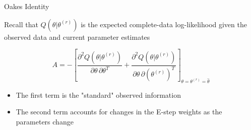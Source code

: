 \documentclass{beamer}
\begin{document}
\begin{frame}{Oakes Identity}

    Recall that $Q(\theta|\theta^{(r)})$ is the expected complete-data log-likelihood given the observed data and current parameter estimates

\[
A=
-\left[
\frac{\partial^2 Q(\theta|\theta^{(r)})}{\partial\theta\,\partial\theta^{T}}
+
\frac{\partial^2 Q(\theta|\theta^{(r)})}{\partial\theta\,\partial(\theta^{(r)})^{T}}
\right]_{\theta=\theta^{(r)}=\widehat\theta}
\]
\medskip
\begin{itemize}
    \item The first term is the "standard" observed information
    \item The second term accounts for changes in the E-step weights as the parameters change
\end{itemize}

\end{frame}





\end{document}
